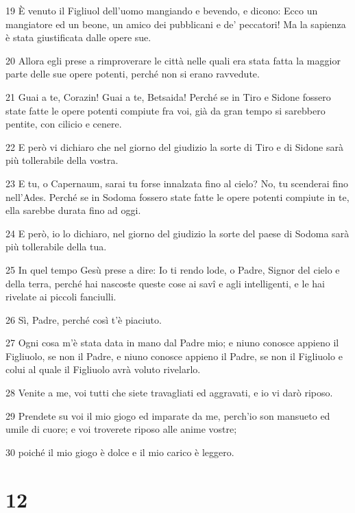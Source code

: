 \par 19 È venuto il Figliuol dell'uomo mangiando e bevendo, e dicono: Ecco un mangiatore ed un beone, un amico dei pubblicani e de' peccatori! Ma la sapienza è stata giustificata dalle opere sue.
\par 20 Allora egli prese a rimproverare le città nelle quali era stata fatta la maggior parte delle sue opere potenti, perché non si erano ravvedute.
\par 21 Guai a te, Corazin! Guai a te, Betsaida! Perché se in Tiro e Sidone fossero state fatte le opere potenti compiute fra voi, già da gran tempo si sarebbero pentite, con cilicio e cenere.
\par 22 E però vi dichiaro che nel giorno del giudizio la sorte di Tiro e di Sidone sarà più tollerabile della vostra.
\par 23 E tu, o Capernaum, sarai tu forse innalzata fino al cielo? No, tu scenderai fino nell'Ades. Perché se in Sodoma fossero state fatte le opere potenti compiute in te, ella sarebbe durata fino ad oggi.
\par 24 E però, io lo dichiaro, nel giorno del giudizio la sorte del paese di Sodoma sarà più tollerabile della tua.
\par 25 In quel tempo Gesù prese a dire: Io ti rendo lode, o Padre, Signor del cielo e della terra, perché hai nascoste queste cose ai savî e agli intelligenti, e le hai rivelate ai piccoli fanciulli.
\par 26 Sì, Padre, perché così t'è piaciuto.
\par 27 Ogni cosa m'è stata data in mano dal Padre mio; e niuno conosce appieno il Figliuolo, se non il Padre, e niuno conosce appieno il Padre, se non il Figliuolo e colui al quale il Figliuolo avrà voluto rivelarlo.
\par 28 Venite a me, voi tutti che siete travagliati ed aggravati, e io vi darò riposo.
\par 29 Prendete su voi il mio giogo ed imparate da me, perch'io son mansueto ed umile di cuore; e voi troverete riposo alle anime vostre;
\par 30 poiché il mio giogo è dolce e il mio carico è leggero.

\chapter{12}

